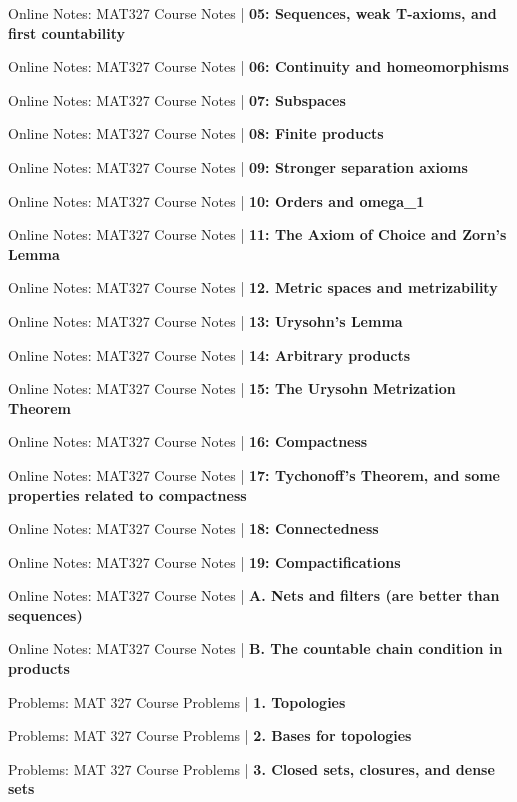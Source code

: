 \documentclass[a4, landscape, 12pt]{article}
\newcommand{\checkbox}{$\square$}%
\begin{document}
\begin{itemize}
{{}
\item [\checkbox] Online Notes: MAT327 Course Notes  | \textbf{05: Sequences, weak T-axioms, and first countability
}
\item [\checkbox] Online Notes: MAT327 Course Notes  | \textbf{06: Continuity and homeomorphisms
}
\item [\checkbox] Online Notes: MAT327 Course Notes  | \textbf{07: Subspaces
}
\item [\checkbox] Online Notes: MAT327 Course Notes  | \textbf{08: Finite products
}
\item [\checkbox] Online Notes: MAT327 Course Notes  | \textbf{09: Stronger separation axioms
}
\item [\checkbox] Online Notes: MAT327 Course Notes  | \textbf{10: Orders and omega_1
}
\item [\checkbox] Online Notes: MAT327 Course Notes  | \textbf{11: The Axiom of Choice and Zorn's Lemma
}
\item [\checkbox] Online Notes: MAT327 Course Notes  | \textbf{12. Metric spaces and metrizability
}
\item [\checkbox] Online Notes: MAT327 Course Notes  | \textbf{13: Urysohn's Lemma
}
\item [\checkbox] Online Notes: MAT327 Course Notes  | \textbf{14: Arbitrary products
}
\item [\checkbox] Online Notes: MAT327 Course Notes  | \textbf{15: The Urysohn Metrization Theorem
}
\item [\checkbox] Online Notes: MAT327 Course Notes  | \textbf{16: Compactness
}
\item [\checkbox] Online Notes: MAT327 Course Notes  | \textbf{17: Tychonoff's Theorem, and some properties related to compactness
}
\item [\checkbox] Online Notes: MAT327 Course Notes  | \textbf{18: Connectedness
}
\item [\checkbox] Online Notes: MAT327 Course Notes  | \textbf{19: Compactifications
}
\item [\checkbox] Online Notes: MAT327 Course Notes  | \textbf{A. Nets and filters (are better than sequences)
}
\item [\checkbox] Online Notes: MAT327 Course Notes  | \textbf{B. The countable chain condition in products
}
\item [\checkbox] Problems: MAT 327 Course Problems  | \textbf{1. Topologies
}
\item [\checkbox] Problems: MAT 327 Course Problems  | \textbf{2. Bases for topologies
}
\item [\checkbox] Problems: MAT 327 Course Problems  | \textbf{3. Closed sets, closures, and dense sets
}}
\end{itemize}
\end{document}
